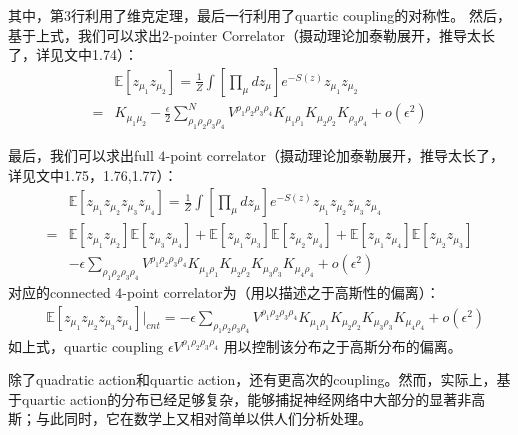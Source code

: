 其中，第$3$行利用了维克定理，最后一行利用了quartic coupling的对称性。
然后，基于上式，我们可以求出$2$-pointer Correlator（摄动理论加泰勒展开，推导太长了，详见文中1.74）：
\begin{equation}
    \begin{split}
        & \mathbb{E}[z_{\mu_1}z_{\mu_2}] = \frac{1}{Z}\int \left[
            \prod_{\mu}d\!z_{\mu}
        \right]
        e^{-S(z)} z_{\mu_1} z_{\mu_2} \\
        = & K_{\mu_1\mu_2} - \frac{\epsilon}{2} \sum_{\rho_1\rho_2\rho_3\rho_4}^N
        V^{\rho_1\rho_2\rho_3\rho_4}
        K_{\mu_1\rho_1}K_{\mu_2\rho_2}K_{\rho_3\rho_4}
        + o(\epsilon^2)
    \end{split}
\end{equation}

最后，我们可以求出full $4$-point correlator（摄动理论加泰勒展开，推导太长了，详见文中1.75，1.76,1.77）：
\begin{equation}
    \begin{split}
        & \mathbb{E}[z_{\mu_1}z_{\mu_2}z_{\mu_3}z_{\mu_4}] = \frac{1}{Z}\int \left[
            \prod_{\mu}d\!z_{\mu}
        \right]
        e^{-S(z)} z_{\mu_1} z_{\mu_2}z_{\mu_3} z_{\mu_4} \\
        = & \mathbb{E}[{z_{\mu_1}z_{\mu_2}}]\mathbb{E}[{z_{\mu_3}z_{\mu_4}}]
        +\mathbb{E}[{z_{\mu_1}z_{\mu_3}}]\mathbb{E}[{z_{\mu_2}z_{\mu_4}}]
        +\mathbb{E}[{z_{\mu_1}z_{\mu_4}}]\mathbb{E}[{z_{\mu_2}z_{\mu_3}}]\\
        & -\epsilon \sum_{\rho_1\rho_2\rho_3\rho_4}
            V^{\rho_1\rho_2\rho_3\rho_4}
            K_{\mu_1\rho_1}K_{\mu_2\rho_2}K_{\mu_3\rho_3}K_{\mu_4\rho_4}
        +o(\epsilon^2)
    \end{split}
\end{equation}
对应的connected $4$-point correlator为（用以描述之于高斯性的偏离）：
\begin{equation}
    \begin{split}
        & \mathbb{E}[z_{\mu_1}z_{\mu_2}z_{\mu_3}z_{\mu_4}] |_{cnt} = 
        -\epsilon \sum_{\rho_1\rho_2\rho_3\rho_4}
            V^{\rho_1\rho_2\rho_3\rho_4}
            K_{\mu_1\rho_1}K_{\mu_2\rho_2}K_{\mu_3\rho_3}K_{\mu_4\rho_4}
        +o(\epsilon^2)
    \end{split}
\end{equation}
如上式，quartic coupling $\epsilon V^{\rho_1\rho_2\rho_3\rho_4}$ 用以控制该分布之于高斯分布的偏离。

除了quadratic action和quartic action，还有更高次的coupling。然而，实际上，基于quartic action的分布已经足够复杂，能够捕捉神经网络中大部分的显著非高斯；与此同时，它在数学上又相对简单以供人们分析处理。